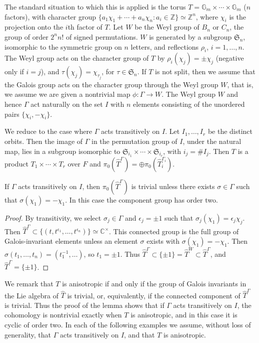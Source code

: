 \documentclass{amsart}
\newcommand\fS{{\mathfrak S}}
\newcommand\G{{\mathbb G}}
\newcommand\C{{\mathbb C}}
\newcommand\Z{{\mathbb Z}}
\newenvironment{cthm}[1]
  {\renewcommand\thethm{\sc #1}\thm}
  {\endthm}
\begin{document}
The standard situation to which this is applied is the
torus $T = \G_m\times\cdots\times \G_m$ ($n$ factors), with
character group $\{a_1\chi_1+\cdots+ a_n\chi_n: a_i\in \Z\}
\simeq\Z^n$, where $\chi_i$ is the projection onto the $i$th
factor of $T$.  Let $W$ be the Weyl group of $B_n$ or $C_n$,
the group of order $2^n n!$ of signed permutations.  $W$ is
generated by a subgroup $\fS_n$, isomorphic to the symmetric group
on $n$ letters, and reflections $\rho_i$, $i=1,\ldots,n$.  The
Weyl group acts on the character group of $T$ by $\rho_i(\chi_j) = \pm \chi_j$
(negative only if $i=j$), and $\tau(\chi_j) = \chi_{\tau_j}$,
for $\tau\in \fS_n$.   If $T$ is not split, then
we assume that the Galois group acts on the character group
through the Weyl group $W$, that is, we assume we are given
a nontrivial map $\phi:\Gamma\to W$.
The Weyl group $W$ and
hence $\Gamma$ act naturally on the set $I$ with $n$ elements
consisting of the unordered pairs $\{\chi_i,-\chi_i\}$.  

We reduce to the case where $\Gamma$ acts transitively on $I$.
Let
$I_1,\ldots, I_r$ be the distinct orbits.  Then the
image of $\Gamma$ in the permutation group of $I$,
under the natural map,
lies in a subgroup isomorphic to $\fS_{i_1}\times\cdots\times 
\fS_{i_r}$,  with $i_j= \# I_j$.
Then $T$ is a product $T_1\times\cdots\times T_r$ over $F$ and 
$\pi_0(\hat T^\Gamma) = \oplus \pi_0(\hat T_i^{\Gamma_i})$.

\bigskip
\noindent
\begin{cthm}{Lemma 4.1}   If $\Gamma$ acts transitively on $I$, then
$\pi_0(\hat T^\Gamma)$ is trivial unless there exists
$\sigma\in \Gamma$ such that $\sigma(\chi_1) =-\chi_1$.  In
this case the component group has order two.
\end{cthm}

\bigskip
\noindent
\begin{proof}    By transitivity, we select $\sigma_j\in \Gamma$
and $\epsilon_j=\pm 1$ such that $\sigma_j(\chi_1)=\epsilon_j\chi_j$.
Then $\hat T^\Gamma \subset \{(t,t^{\epsilon_1},\ldots,t^{\epsilon_n})\}
\simeq \C^\times$.   This connected group is the full group
of Galois-invariant elements unless an element $\sigma$ exists
with $\sigma(\chi_1)=-\chi_1$.  Then $\sigma(t_1,\ldots,t_n) =
(t_1^{-1},\ldots)$, so $t_1 = {\pm 1}$.  
Thus $\hat T^\Gamma\subset \{\pm1\} = \hat T^W \subset
\hat T^\Gamma$, and $\hat T^\Gamma =\{\pm1\}$.\end{proof}

\smallskip
We remark that $T$ is anisotropic if and only if the group
of Galois invariants in the Lie algebra of $\hat T$ is trivial,
or, equivalently, if the connected component of $\hat T^\Gamma$
is trivial.  Thus the proof of the lemma shows 
that if $\Gamma$ acts transitively
on $I$, the cohomology is nontrivial exactly when $T$ is
anisotropic, and in this case it is cyclic of order two.
In each of the following examples we assume, without
loss of generality, that $\Gamma$ acts transitively on $I$,
and that $T$ is anisotropic.
\end{document}
